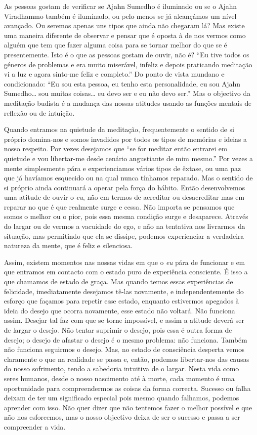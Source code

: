 As pessoas gostam de verificar se Ajahn Sumedho é iluminado ou se o
Ajahn Viradhammo também é iluminado, ou pelo menos se já alcançámos um
nível avançado. Ou seremos apenas uns tipos que ainda não chegaram lá?
Mas existe uma maneira diferente de observar e pensar que é oposta à de
nos vermos como alguém que tem que fazer alguma coisa para se tornar
melhor do que se é presentemente. Isto é o que as pessoas gostam de
ouvir, não é? ``Eu tive todos os géneros de problemas e era muito
miserável, infeliz e depois praticando meditação vi a luz e agora
sinto-me feliz e completo.'' Do ponto de vista mundano e condicionado:
``Eu sou esta pessoa, eu tenho esta personalidade, eu sou Ajahn
Sumedho\ldots{} sou muitas coisas\ldots{} eu devo ser e eu não devo ser.'' Mas o
objectivo da meditação budista é a mudança das nossas atitudes usando as
funções mentais de reflexão ou de intuição.

Quando entramos na quietude da meditação, frequentemente o sentido de si
próprio domina-nos e somos invadidos por todos os tipos de memórias e
ideias a nosso respeito. Por vezes desejamos que ``se for meditar então
entrarei em quietude e vou libertar-me desde cenário angustiante de mim
mesmo.'' Por vezes a mente simplesmente pára e experienciamos vários
tipos de êxtase, ou uma paz que já havíamos esquecido ou na qual nunca
tínhamos reparado. Mas o sentido de si próprio ainda continuará a operar
pela força do hábito. Então desenvolvemos uma atitude de ouvir o
\emph{eu}, não em termos de acreditar ou desacreditar mas em reparar no
que é que realmente surge e cessa. Não importa se pensamos que somos o
melhor ou o pior, pois essa mesma condição surge e desaparece. Através
do largar ou de vermos a vacuidade do ego, e não na tentativa nos
livrarmos da situação, mas permitindo que ela se dissipe, podemos
experienciar a verdadeira natureza da mente, que é feliz e silenciosa.

Assim, existem momentos nas nossas vidas em que o \emph{eu} pára de
funcionar e em que entramos em contacto com o estado puro de experiência
consciente. É isso a que chamamos de estado de graça. Mas quando temos
essas experiências de felicidade, imediatamente desejamos tê-las
novamente, e independentemente do esforço que façamos para repetir esse
estado, enquanto estivermos apegados à ideia do desejo que ocorra
novamente, esse estado não voltará. Não funciona assim. Desejar tal faz
com que se torne impossível, e assim a atitude deverá ser de largar o
desejo. Não tentar suprimir o desejo, pois essa é outra forma de desejo;
o desejo de afastar o desejo é o mesmo problema: não funciona. Também
não funciona seguirmos o desejo. Mas, no estado de consciência desperta
vemos claramente o que na realidade se passa e, então, podemos
libertar-nos das causas do nosso sofrimento, tendo a sabedoria intuitiva
de o largar. Nesta vida como seres humanos, desde o nosso nascimento até
à morte, cada momento é uma oportunidade para compreendermos as coisas
da forma correcta. Sucesso ou falha deixam de ter um significado
especial pois mesmo quando falhamos, podemos aprender com isso. Não quer
dizer que não tentemos fazer o melhor possível e que não nos esforcemos,
mas o nosso objectivo deixa de ser o sucesso e passa a ser compreender a
vida.

